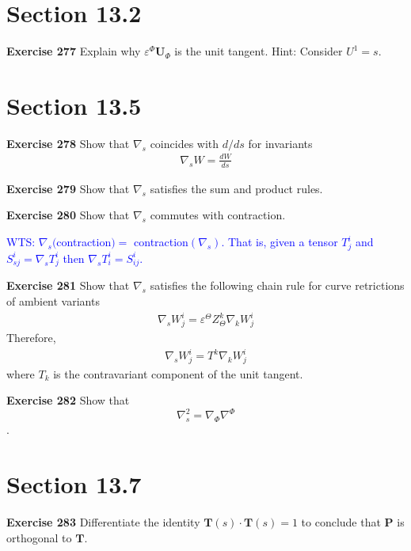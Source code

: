 \documentclass[12pt,a4paper]{report}
\newcommand{\BLUE}[1]{\textcolor{blue}{#1}}
\begin{document}
\begin{description}

\section*{Section 13.2}
\item \textbf{Exercise 277} Explain why $\varepsilon^\Phi\textbf{U}_\Phi$ is the unit tangent.  Hint: Consider $U^1=s$.

\section*{Section 13.5}
\item \textbf{Exercise 278} Show that $\nabla_s$ coincides with $d/ds$ for invariants
\begin{align*}
	\nabla_s W = \frac{dW}{ds}
\end{align*}

\item \textbf{Exercise 279}  Show that $\nabla_s$ satisfies the sum and product rules.

\item \textbf{Exercise 280}  Show that $\nabla_s$ commutes with contraction.

\BLUE{WTS: $\nabla_s ($contraction$)=$ contraction$(\nabla_s)$.  That is, given a tensor $T^i_j$ and $S^i_{sj} = \nabla_s T^i_j$ then $\nabla_s T^i_i = S^i_{ij}$.
}

\item \textbf{Exercise 281}  Show that $\nabla_s$ satisfies the following chain rule for curve retrictions of ambient variants
\begin{align*}
	\nabla_s W^i_j=\varepsilon^\Theta Z^k_\Theta \nabla_k W^i_j
\end{align*}Therefore, 
\begin{align*}
	\nabla_s W^i_j = T^k\nabla_k W^i_j
\end{align*}where $T_k$ is the contravariant component of the unit tangent.

\item \textbf{Exercise 282} Show that $$\nabla_s^2= \nabla_\Phi \nabla^\Phi$$.

\section*{Section 13.7}

\item \textbf{Exercise 283} Differentiate the identity $\textbf{T}(s)\cdot\textbf{T}(s)=1$ to conclude that $\textbf{P}$ is orthogonal to $\textbf{T}$.


\end{description}
\end{document}

